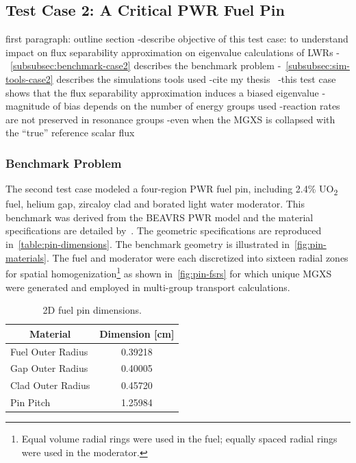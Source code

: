 \subsection{Test Case 2: A Critical PWR Fuel Pin}
\label{subsec:test-case2}

first paragraph: outline section
-describe objective of this test case: to understand impact on flux separability approximation on eigenvalue calculations of LWRs
-~\autoref{subsubsec:benchmark-case2} describes the benchmark problem
-~\autoref{subsubsec:sim-tools-case2} describes the simulations tools used
-cite my thesis~\cite{boyd2016thesis}
-this test case shows that the flux separability approximation induces a biased eigenvalue
  -magnitude of bias depends on the number of energy groups used
  -reaction rates are not preserved in resonance groups
  -even when the MGXS is collapsed with the ``true'' reference scalar flux

\subsubsection{Benchmark Problem}
\label{subsubsec:benchmark-case2}

The second test case modeled a four-region PWR fuel pin, including  2.4\% UO\textsubscript{2} fuel, helium gap, zircaloy clad and borated light water moderator. This benchmark was derived from the BEAVRS PWR model and the material specifications are detailed by~\cite{horelik2013beavrs}. The geometric specifications are reproduced in~\autoref{table:pin-dimensions}. The benchmark geometry is illustrated in~\autoref{fig:pin-materials}. The fuel and moderator were each discretized into sixteen radial zones for spatial homogenization\footnote{Equal volume radial rings were used in the fuel; equally spaced radial rings were used in the moderator.} as shown in~\autoref{fig:pin-fsrs} for which unique MGXS were generated and employed in multi-group transport calculations.

\begin{table}[h!]
  \centering
  \caption{2D fuel pin dimensions.}
  \label{table:pin-dimensions} 
  \begin{tabular}{l c}
  \toprule
  \multicolumn{1}{c}{\bf Material} &
  {\bf Dimension [cm]} \\
  \midrule
  Fuel Outer Radius & 0.39218 \\
  Gap Outer Radius &  0.40005 \\
  Clad Outer Radius & 0.45720 \\
  Pin Pitch &         1.25984 \\
  \bottomrule
\end{tabular}
\end{table}


